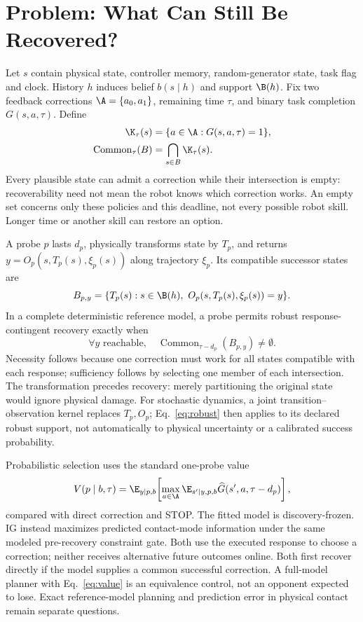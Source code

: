 \section{Problem: What Can Still Be Recovered?}
Let $s$ contain physical state, controller memory, random-generator state, task flag and clock. History $h$ induces belief $b(s\mid h)$ and support $\B(h)$. Fix two feedback corrections $\A=\{a_0,a_1\}$, remaining time $\tau$, and binary task completion $G(s,a,\tau)$. Define
\begin{equation}
\begin{split}
\K_\tau(s)&=\{a\in\A:G(s,a,\tau)=1\},\\
\operatorname{Common}_\tau(B)&=\bigcap_{s\in B}\K_\tau(s).
\end{split}\label{eq:set}
\end{equation}
Every plausible state can admit a correction while their intersection is empty: recoverability need not mean the robot knows which correction works. An empty set concerns only these policies and this deadline, not every possible robot skill. Longer time or another skill can restore an option.

A probe $p$ lasts $d_p$, physically transforms state by $T_p$, and returns $y=O_p(s,T_p(s),\xi_p(s))$ along trajectory $\xi_p$. Its compatible successor states are
\begin{equation}
 B_{p,y}=\{T_p(s):s\in\B(h),\ O_p(s,T_p(s),\xi_p(s))=y\}.
\end{equation}
In a complete deterministic reference model, a probe permits robust response-contingent recovery exactly when
\begin{equation}
 \forall y\text{ reachable},\quad \operatorname{Common}_{\tau-d_p}(B_{p,y})\ne\emptyset.
 \label{eq:robust}
\end{equation}
Necessity follows because one correction must work for all states compatible with each response; sufficiency follows by selecting one member of each intersection. The transformation precedes recovery: merely partitioning the original state would ignore physical damage. For stochastic dynamics, a joint transition--observation kernel replaces $T_p,O_p$; Eq.~\eqref{eq:robust} then applies to its declared robust support, not automatically to physical uncertainty or a calibrated success probability.

Probabilistic selection uses the standard one-probe value
\begin{equation}
 V(p\mid b,\tau)=\E_{y\mid p,b}\!\left[\max_{a\in\A}\E_{s'\mid y,p,b}\widehat G(s',a,\tau-d_p)\right],
 \label{eq:value}
\end{equation}
compared with direct correction and STOP. The fitted model is discovery-frozen. IG instead maximizes predicted contact-mode information under the same modeled pre-recovery constraint gate. Both use the executed response to choose a correction; neither receives alternative future outcomes online. Both first recover directly if the model supplies a common successful correction. A full-model planner with Eq.~\eqref{eq:value} is an equivalence control, not an opponent expected to lose. Exact reference-model planning and prediction error in physical contact remain separate questions.

